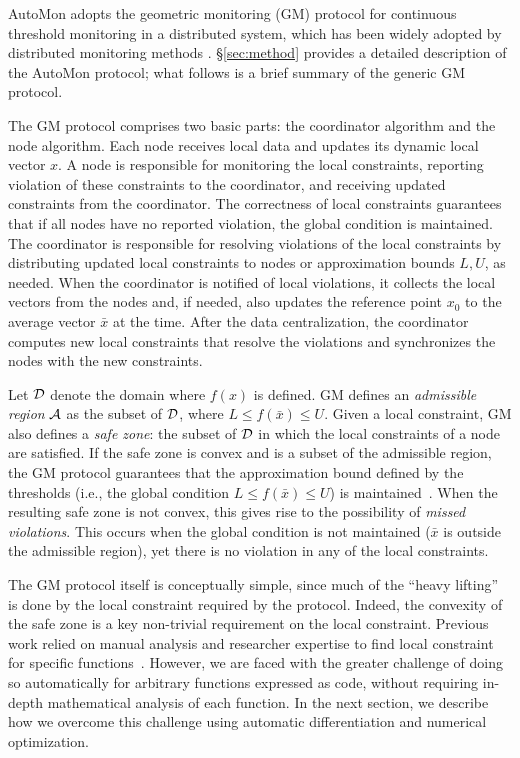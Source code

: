 %
AutoMon adopts the geometric monitoring (GM) protocol for continuous threshold monitoring in a distributed system, which has been widely adopted by distributed monitoring methods \cite{gabel:entropy_approximation,gabel:monitoring_least_squares,gabel:variance_monitoring}.
\S\ref{sec:method} provides a detailed description of the AutoMon protocol; what follows is a brief summary of the generic GM protocol.

The GM protocol comprises two basic parts: the coordinator algorithm and the node algorithm.
Each node receives local data and updates its dynamic local vector $x$.
A node is responsible for monitoring the local constraints, reporting violation of these constraints to the coordinator, and receiving updated constraints from the coordinator.
The correctness of local constraints guarantees that if all nodes have no reported violation, the global condition is maintained.
%
The coordinator is responsible for resolving violations of the local constraints by distributing updated local constraints to nodes or approximation bounds $L,U$, as needed.
When the coordinator is notified of local violations, it collects the local vectors from the nodes and, if needed, also updates the reference point $x_0$ to the average vector $\bar{x}$ at the time.
After the data centralization, the coordinator computes new local constraints that resolve the violations and synchronizes the nodes with the new constraints.


Let $\mathcal{D}$ denote the domain where $f(x)$ is defined.
GM defines an \emph{admissible region} $\mathcal{A}$ as the subset of $\mathcal{D}$, where $L \le f(\bar{x}) \le U$.
Given a local constraint, GM also defines a \emph{safe zone}: the subset of $\mathcal{D}$ in which the local constraints of a node are satisfied.
If the safe zone is convex and is a subset of the admissible region, the GM protocol guarantees that the approximation bound defined by the thresholds (i.e., the global condition $L \le f(\bar{x}) \le U$) is maintained~\cite{gabel:entropy_approximation,lazerson:one_for_all}.
When the resulting safe zone is not convex, this gives rise to the possibility of \emph{missed violations}.
This occurs when the global condition is not maintained ($\bar{x}$ is outside the admissible region), yet there is no violation in any of the local constraints.


The GM protocol itself is conceptually simple, since much of the ``heavy lifting'' is done by the local constraint required by the protocol.
Indeed, the convexity of the safe zone is a key non-trivial requirement on the local constraint.
Previous work relied on manual analysis and researcher expertise to find local constraint for specific functions~\cite{gabel:entropy_approximation,yeuda2017graph,papapetrou2014skylines,gabel:monitoring_least_squares,gabel:variance_monitoring}.
However, we are faced with the greater challenge of doing so automatically for arbitrary functions expressed as code, without requiring in-depth mathematical analysis of each function.
In the next section, we describe how we overcome this challenge using automatic differentiation and numerical optimization.
